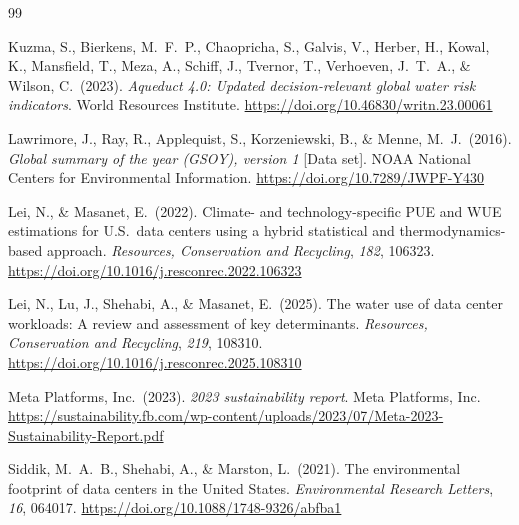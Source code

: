 \documentclass[11pt, letterpaper]{article}
\begin{document}
\begin{thebibliography}{99}

Kuzma, S., Bierkens, M.\ F.\ P., Chaopricha, S., Galvis, V., Herber, H., Kowal, K., Mansfield, T., Meza, A., Schiff, J., Tvernor, T., Verhoeven, J.\ T.\ A., \& Wilson, C.\ (2023).
\textit{Aqueduct 4.0: Updated decision-relevant global water risk indicators}.
World Resources Institute.
\url{https://doi.org/10.46830/writn.23.00061}

Lawrimore, J., Ray, R., Applequist, S., Korzeniewski, B., \& Menne, M.\ J.\ (2016).
\textit{Global summary of the year (GSOY), version 1} [Data set].
NOAA National Centers for Environmental Information.
\url{https://doi.org/10.7289/JWPF-Y430}

Lei, N., \& Masanet, E.\ (2022).
Climate- and technology-specific PUE and WUE estimations for U.S.\ data centers using a hybrid statistical and thermodynamics-based approach.
\textit{Resources, Conservation and Recycling}, \textit{182}, 106323.
\url{https://doi.org/10.1016/j.resconrec.2022.106323}

Lei, N., Lu, J., Shehabi, A., \& Masanet, E.\ (2025).
The water use of data center workloads: A review and assessment of key determinants.
\textit{Resources, Conservation and Recycling}, \textit{219}, 108310.
\url{https://doi.org/10.1016/j.resconrec.2025.108310}

Meta Platforms, Inc.\ (2023).
\textit{2023 sustainability report}.
Meta Platforms, Inc.
\url{https://sustainability.fb.com/wp-content/uploads/2023/07/Meta-2023-Sustainability-Report.pdf}

Siddik, M.\ A.\ B., Shehabi, A., \& Marston, L.\ (2021).
The environmental footprint of data centers in the United States.
\textit{Environmental Research Letters}, \textit{16}, 064017.
\url{https://doi.org/10.1088/1748-9326/abfba1}

\end{thebibliography}
\end{document}
